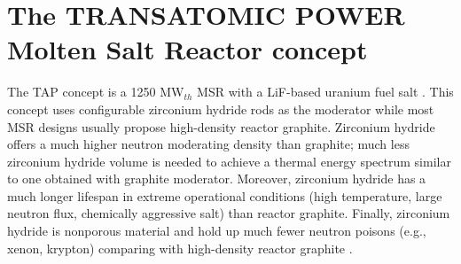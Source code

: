 \documentclass[12pt]{article} %
\begin{document}
\section{The TRANSATOMIC POWER Molten Salt Reactor concept}
The \gls{TAP} concept is a 1250 MW$_{th}$ \gls{MSR} with a LiF-based uranium fuel 
salt \cite{transatomic_power_corporation_technical_2016}. This concept uses 
configurable zirconium hydride rods as the moderator while most \gls{MSR} designs 
usually propose high-density reactor graphite. Zirconium hydride offers a much 
higher neutron moderating density than graphite; much less zirconium hydride 
volume is needed to achieve a thermal energy spectrum similar to one obtained 
with graphite moderator. Moreover, zirconium hydride has a much 
longer lifespan in extreme operational conditions (high temperature, large 
neutron flux, chemically aggressive salt) than reactor graphite. Finally, 
zirconium hydride is nonporous material and hold up much fewer neutron poisons 
(e.g., xenon, krypton) comparing with high-density reactor graphite \cite{transatomic_power_corporation_technical_2016, transatomic_power_corporation_neutronics_2016, betzler_two-dimensional_2016}.
\end{document}
